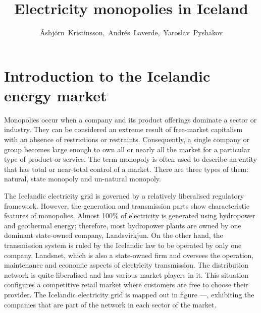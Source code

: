 \documentclass[svn, final]{rureport}
\author{Ásbjörn~Kristinsson,~Andrés~Laverde,~Yaroslav~Pyshakov}  %
\title{Electricity monopolies in Iceland}  %
\begin{document}
\maketitle  %
\listoffixmes{}

\section{Introduction to the Icelandic energy market}

Monopolies occur when a company and its product offerings dominate a sector or industry. They can be considered an extreme result of free-market capitalism with an absence of restrictions or restraints. Consequently, a single company or group becomes large enough to own all or nearly all the market for a particular type of product or service. The term monopoly is often used to describe an entity that has total or near-total control of a market. There are three types of them: natural, state monopoly and un-natural monopoly. 

The Icelandic electricity grid is governed by a relatively liberalised regulatory framework. However, the generation and transmission parts show characteristic features of monopolies. Almost 100\% of electricity is generated using hydropower and geothermal energy; therefore, most hydropower plants are owned by one dominant state-owned company, Landsvirkjun. On the other hand, the transmission system is ruled by the Icelandic law to be operated by only one company, Landsnet, which is also a state-owned firm and oversees the operation, maintenance and economic aspects of electricity transmission. The distribution network is quite liberalised and has various market players in it. This situation configures a competitive retail market where customers are free to choose their provider. The Icelandic electricity grid is mapped out in figure ---, exhibiting the companies that are part of the network in each sector of the market. 
\end{document}
